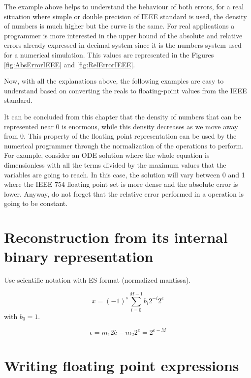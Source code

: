 The example above helps to understand the behaviour of both errors, for a real situation where simple or double precision of IEEE standard is used, the density of numbers is much higher but the curve is the same. For real applications a programmer is more interested in the upper bound of the absolute and relative errors already expressed in decimal system since it is the numbers system used for a numerical simulation. This values are represented in the Figures \ref{fig:AbsErrorIEEE} and \ref{fig:RelErrorIEEE}.

Now, with all the explanations above, the following examples are easy to understand based on converting the reals to floating-point values from the IEEE standard. 

It can be concluded from this chapter that the density of numbers that can be represented near 0 is enormous, while this density decreases as we move away from 0. This property of the floating point representation can be used by the numerical programmer through the normalization of the operations to perform. For example, consider an ODE solution where the whole equation is dimensionless with all the terms divided by the maximum values that the variables are going to reach. In this case, the solution will vary between 0 and 1 where the IEEE 754 floating point set is more dense and the absolute error is lower. Anyway, do not forget that the relative error performed in a operation is going to be constant. 



\section{Reconstruction from its internal binary representation}
Use scientific notation with ES format (normalized mantissa).

$$
   x = (-1) ^s \sum_{i=0}^{M-1}  b_i 2^{-i} 2^e 
$$
with $b_0 = 1$. 

$$
   \epsilon = m_1 2 ê - m_2 2^e  = 2^{e-M} 
$$



\section{Writing floating point expressions}

